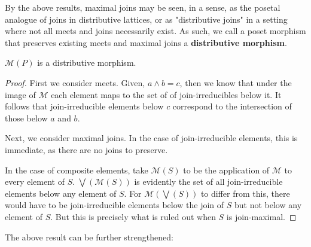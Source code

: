 \documentclass[hoptionsi,review,format=sigplan]{acmart}
\theoremstyle{definition}
\newcommand{\Mcc}{\mathcal{M}}
\begin{document}


By the above results, maximal joins may be seen, in a sense, as the posetal analogue of joins in distributive lattices, or as "distributive joins" in a setting where not all meets and joins necessarily exist. As such, we call a poset morphism that preserves existing meets and maximal joins a \textbf{distributive morphism}.

\begin{lemma}
\(\Mcc(P)\) is a distributive morphism.
\end{lemma}
\begin{proof}

First we consider meets. Given, \(a \wedge b = c\), then we know that under the image of \(\Mcc\) each element maps to the set of of join-irreducibles below it. It follows that join-irreducible elements below \(c\) correspond to the intersection of those below \(a\) and \(b\).

Next, we consider maximal joins. In the case of join-irreducible elements, this is immediate, as there are no joins to preserve.

In the case of composite elements, take \(\Mcc(S)\) to be the application of \(\Mcc\) to every element of \(S\). \(\bigvee(\Mcc(S))\) is evidently the set of all join-irreducible elements below any element of \(S\). For \(\Mcc(\bigvee(S))\) to differ from this, there would have to be join-irreducible elements below the join of \(S\) but not below any element of \(S\). But this is precisely what is ruled out when \(S\) is join-maximal.
\end{proof}

The above result can be further strengthened:
\end{document}
